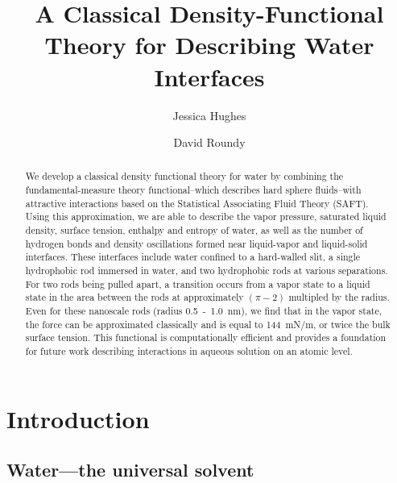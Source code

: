 \documentclass[letterpaper,twocolumn,amsmath,amssymb,prb]{revtex4-1}
\begin{document}
\title{A Classical Density-Functional Theory for Describing Water Interfaces}

\author{Jessica Hughes}

\author{David Roundy}

\begin{abstract}
{We develop a classical density functional theory for water by combining the
fundamental-measure theory functional--which describes hard sphere fluids--with
attractive interactions based on the Statistical Associating Fluid Theory
(SAFT). Using this approximation, we are able to describe the vapor pressure, 
saturated liquid density, surface tension, enthalpy and
entropy of water, as well as the number of hydrogen bonds and density oscillations
formed near
liquid-vapor and liquid-solid interfaces. These interfaces include water
confined to a hard-walled slit, a single hydrophobic rod immersed in water, and
two hydrophobic rods 
at various separations. For two rods being pulled apart, a transition occurs 
from a vapor state to a liquid state in the area between
the rods at approximately $(\pi-2)$ multipled by the radius. Even 
for these nanoscale rods (radius 0.5~-~1.0~nm), we find that in the
vapor state, the force can be approximated
classically and is equal to 144~mN/m, or twice the bulk surface tension.
This functional is computationally efficient and provides a foundation for 
future work describing interactions in aqueous solution on an
atomic level.}

\end{abstract}

\maketitle

\section{Introduction}

\subsection{Water---the universal solvent}
\end{document}
